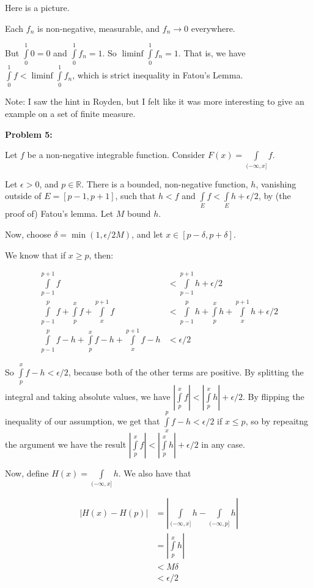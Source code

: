 \documentclass[a4paper,12pt]{article}
\newcommand{\shunt}{\vspace{20mm}}
\newcommand{\absval}[1]{\left\lvert #1 \right\rvert}
\newcommand{\de}{\delta}
\newcommand{\ep}{\epsilon}
\newcommand{\R}{\mathbb{R}}
\begin{document}
Here is a picture.

\shunt

\shunt %

Each $f_n$ is non-negative, measurable, and $f_n \to 0$ everywhere.

But $\int\limits_0^1 0 = 0$ and $\int\limits_0^1 f_n = 1$. So $\liminf\int\limits_0^1 f_n = 1$. That is, we have $\int\limits_0^1 f < \liminf\int\limits_0^1 f_n$, which is strict inequality in Fatou's Lemma.

Note: I saw the hint in Royden, but I felt like it was more interesting to give an example on a set of finite measure.

\shunt

{\bf Problem 5:} %

Let $f$ be a non-negative integrable function. Consider $F(x) = \int\limits_{(-\infty,x]} f$.

Let $\ep >0$, and $p \in \R$. There is a bounded, non-negative function, $h$, vanishing outside of $E = [p-1,p+1]$, such that $h < f$ and $\int\limits_E f < \int\limits_E h+ \ep/2$, by (the proof of) Fatou's lemma. Let $M$ bound $h$.

Now, choose $\de = \min(1,\ep/2M)$, and let $x \in [p-\de,p+\de]$.

We know that if $x \geq p$, then:

\begin{align*}
\int\limits_{p-1}^{p+1} f &< \int\limits_{p-1}^{p+1} h + \ep/2\\
\int\limits_{p-1}^{p} f + \int\limits_{p}^{x} f + \int\limits_{x}^{p+1} f &< \int\limits_{p-1}^{p} h + \int\limits_{p}^{x} h + \int\limits_{x}^{p+1} h  + \ep/2\\
\int\limits_{p-1}^{p} f-h + \int\limits_{p}^{x} f-h + \int\limits_{x}^{p+1} f-h &< \ep/2
\end{align*}

So $\int\limits_p^x f-h < \ep/2$, because both of the other terms are positive. By splitting the integral and taking absolute values, we have $\absval{\int\limits_p^x f}<\absval{\int\limits_p^x h} + \ep/2$. By flipping the inequality of our assumption, we get that $\int\limits_x^p f-h < \ep/2$ if $x \leq p$, so by repeaitng the argument we have the result $\absval{\int\limits_p^x f}<\absval{\int\limits_p^x h} + \ep/2$ in any case.

Now, define $H(x) = \int\limits_{(-\infty,x]} h$. We also have that

\begin{align*}
\absval{H(x)-H(p)} &= \absval{\int\limits_{(-\infty,x]} h - \int\limits_{(-\infty,p]} h} \\
&=\absval{\int\limits_p^x h} \\
&< M \de \\
&< \ep/2
\end{align*}
\end{document}
